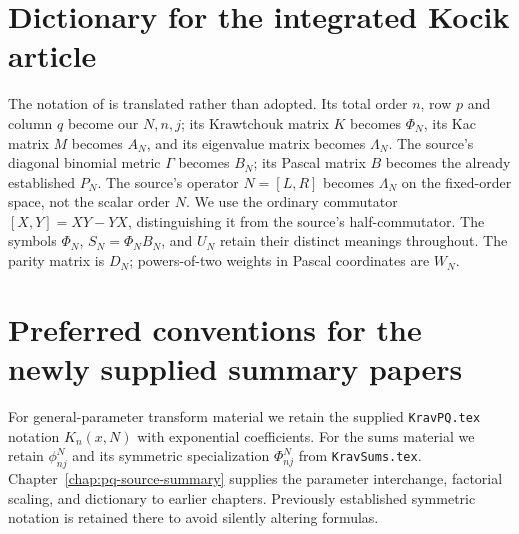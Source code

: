 \documentclass[11pt,oneside]{amsbook}
\theoremstyle{definition}
\theoremstyle{remark}
\begin{document}
\section*{Dictionary for the integrated Kocik article}
The notation of \cite{KocikFeynman} is translated rather than adopted.
Its total order $n$, row $p$ and column $q$ become our $N,n,j$;
its Krawtchouk matrix $K$ becomes $\Phi_N$, its Kac matrix $M$ becomes
$A_N$, and its eigenvalue matrix becomes $\Lambda_N$.
The source's diagonal binomial metric $\Gamma$ becomes $B_N$;
its Pascal matrix $B$ becomes the already established $P_N$.
The source's operator $N=[L,R]$ becomes $\Lambda_N$ on the fixed-order
space, not the scalar order $N$. We use the ordinary commutator
$[X,Y]=XY-YX$, distinguishing it from the source's half-commutator.
The symbols $\Phi_N$, $S_N=\Phi_NB_N$, and $U_N$ retain their distinct
meanings throughout. The parity matrix is $D_N$; powers-of-two weights
in Pascal coordinates are $W_N$.


\section*{Preferred conventions for the newly supplied summary papers}
For general-parameter transform material we retain the supplied
\texttt{KravPQ.tex} notation $K_n(x,N)$ with exponential coefficients.
For the sums material we retain $\phi^N_{nj}$ and its symmetric
specialization $\Phi^N_{nj}$ from \texttt{KravSums.tex}.
Chapter~\ref{chap:pq-source-summary} supplies the parameter interchange,
factorial scaling, and dictionary to earlier chapters. Previously established
symmetric notation is retained there to avoid silently altering formulas.

\tableofcontents
\mainmatter




















\appendix






\backmatter
\end{document}
